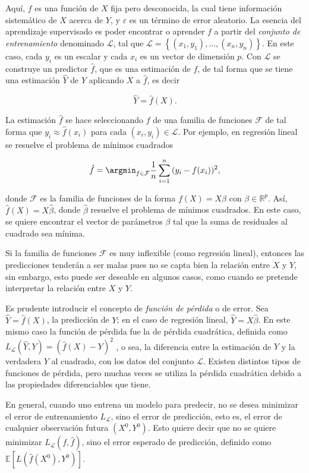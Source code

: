 Aquí, $f$ es una función de $X$ fija pero desconocida, la cual tiene información sistemático de $X$ acerca de $Y$, y $\varepsilon$ es un término de error aleatorio. La esencia del aprendizaje supervisado es poder encontrar o aprender $f$ a partir del \textit{conjunto de entrenamiento} denominado $\mathcal{L}$, tal que $\mathcal{L} = \left\{ (x_1, y_1), ..., (x_n, y_n) \right\}$. En este caso, cada $y_i$ es un escalar y cada $x_i$ es un vector de dimensión $p$. Con $\mathcal{L}$ se construye un predictor $\hat{f}$, que es una estimación de $f$, de tal forma que se tiene una estimación $\hat{Y}$ de $Y$ aplicando $X$ a $\hat{f}$, es decir

$$\hat{Y} = \hat{f}(X).$$

La estimación $\hat{f}$ se hace seleccionando $f$ de una familia de funciones $\mathcal{F}$ de tal forma que $y_i \approx \hat{f}(x_i)$ para cada $(x_i, y_i) \in \mathcal{L}$. Por ejemplo, en regresión lineal se resuelve el problema de mínimos cuadrados

$$\hat{f} = \argmin_{f \in \mathcal{F}} \frac{1}{n} \sum_{i = 1}^n{ ( y_i - f(x_i) ) ^ 2},$$

donde $\mathcal{F}$ es la familia de funciones de la forma $f(X) = X\beta$ con $\beta \in \mathbb{R}^p$. Así, $\hat{f}(X) = X \hat{\beta}$, donde $\hat{\beta}$ resuelve el problema de mínimos cuadrados. En este caso, se quiere encontrar el vector de parámetros $\beta$ tal que la suma de residuales al cuadrado sea mínima.

Si la familia de funciones $\mathcal{F}$ es muy inflexible (como regresión lineal), entonces las predicciones tenderán a ser malas pues no se capta bien la relación entre $X$ y $Y$, sin embargo, esto puede ser deseable en algunos casos, como cuando se pretende interpretar la relación entre $X$ y $Y$.

Es prudente introducir el concepto de \textit{función de pérdida} o de error. Sea $\hat{Y} = \hat{f}(X)$, la predicción de $Y$; en el caso de regresión lineal, $\hat{Y} = X\hat{\beta}$. En este mismo caso la función de pérdida fue la de pérdida cuadrática, definida como 
$L_{\mathcal{L}}(\hat{Y}, Y) = (\hat{f}(X) - Y ) ^2$
, o sea, la diferencia entre la estimación de $Y$ y la verdadera $Y$ al cuadrado, con los datos del conjunto $\mathcal{L}$. Existen distintos tipos de funciones de pérdida, pero muchas veces se utiliza la pérdida cuadrática debido a las propiedades diferenciables que tiene.

En general, cuando uno entrena un modelo para predecir, no se desea minimizar el error de entrenamiento $L_{\mathcal{L}}$, sino el error de predicción, esto es, el error de cualquier observación futura $(X^0, Y^0)$. Esto quiere decir que no se quiere minimizar $L_{\mathcal{L}}(f, \hat{f})$, sino el error esperado de predicción, definido como $\mathbb{E} \left[ L(\hat{f}(X^0), Y^0 ) \right] $.

